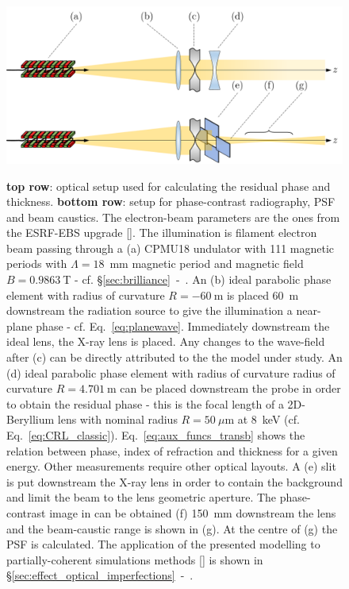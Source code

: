 \begin{refsection}
\begin{figure}[!htb]
    \centering
    {\includegraphics[width=.7\linewidth]{figures/ch04/simulaitons.png}}
    \caption[Optical layout used for modelling imperfections in CRL]{\textbf{top row}: optical setup used for calculating the residual phase and thickness. \textbf{bottom row}: setup for phase-contrast radiography, PSF and beam caustics. The electron-beam parameters are the ones from the ESRF-EBS upgrade [\cite{orangebook}]. The illumination is filament electron beam passing through a (a) CPMU18 undulator with 111 magnetic periods with $\Lambda=18$~mm magnetic period and magnetic field $B=0.9863~$T - cf. \S\ref{sec:brilliance}~-~\textit{}. An (b) ideal parabolic phase element with radius of curvature $R=-60~$m is placed 60~m downstream the radiation source to give the illumination a near-plane phase - cf. Eq.~\ref{eq:planewave}. Immediately downstream the ideal lens, the X-ray lens is placed. Any changes to the wave-field after (c) can be directly attributed to the the model under study. An (d) ideal parabolic phase element with radius of curvature radius of curvature $R=4.701~$m can be placed downstream the probe in order to obtain the residual phase - this is the focal length of a 2D-Beryllium lens with nominal radius $R=50~\mu\text{m}$ at 8~keV (cf. Eq.~\ref{eq:CRL_classic}). Eq.~\ref{eq:aux_funcs_transb} shows the relation between phase, index of refraction and thickness for a given energy. Other measurements require other optical layouts. A (e) slit is put downstream the X-ray lens in order to contain the background and limit the beam to the lens geometric aperture. The phase-contrast image in can be obtained (f) 150~mm downstream the lens and the beam-caustic range is shown in (g). At the centre of (g) the PSF is calculated. The application of the presented modelling to partially-coherent simulations methods [\cite{Chubar2011}] is shown in \S\ref{sec:effect_optical_imperfections}~-~\textit{}.}
    \label{fig:optical_layouts}
\end{figure}

\end{refsection}
